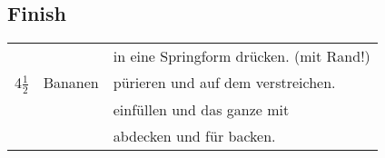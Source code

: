 \subsection*{Finish}
\begin{longtable}{rlL{16.85cm}}
                    &     &   in eine Springform drücken. (mit Rand!) \\
    4$\frac{1}{2}$  &   Bananen                             &   pürieren und auf dem  verstreichen.    \\
                    &       &   einfüllen und das ganze mit \\
                    &               &   abdecken und für  backen.   \\
\end{longtable}